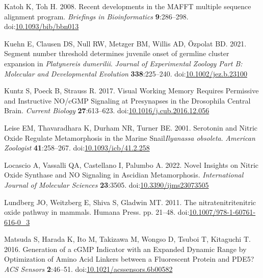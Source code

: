 \documentclass[
  10pt,
  onecolumn]{article}
\newlength{\cslhangindent}
\newlength{\cslentryspacingunit} %
\newenvironment{CSLReferences}[2] %
 {%
  \setlength{\parindent}{0pt}
  \ifodd #1
  \let\oldpar\par
  \def\par{\hangindent=\cslhangindent\oldpar}
  \fi
  \setlength{\parskip}{#2\cslentryspacingunit}
 }%
 {}
\begin{document}
\begin{CSLReferences}{1}{0}
\leavevmode{}%
Katoh K, Toh H. 2008. Recent developments in the MAFFT multiple sequence
alignment program. \emph{Briefings in Bioinformatics}
\textbf{9}:286--298.
doi:\href{https://doi.org/10.1093/bib/bbn013}{10.1093/bib/bbn013}

\leavevmode{}%
Kuehn E, Clausen DS, Null RW, Metzger BM, Willis AD, Özpolat BD. 2021.
Segment number threshold determines juvenile onset of germline cluster
expansion in {\emph{Platynereis dumerilii}}. \emph{Journal of
Experimental Zoology Part B: Molecular and Developmental Evolution}
\textbf{338}:225--240.
doi:\href{https://doi.org/10.1002/jez.b.23100}{10.1002/jez.b.23100}

\leavevmode{}%
Kuntz S, Poeck B, Strauss R. 2017. Visual Working Memory Requires
Permissive and Instructive NO/cGMP Signaling at Presynapses in the
Drosophila Central Brain. \emph{Current Biology} \textbf{27}:613--623.
doi:\href{https://doi.org/10.1016/j.cub.2016.12.056}{10.1016/j.cub.2016.12.056}

\leavevmode{}%
Leise EM, Thavaradhara K, Durham NR, Turner BE. 2001. Serotonin and
Nitric Oxide Regulate Metamorphosis in the Marine Snail{\emph{Ilyanassa
obsoleta}}. \emph{American Zoologist} \textbf{41}:258--267.
doi:\href{https://doi.org/10.1093/icb/41.2.258}{10.1093/icb/41.2.258}

\leavevmode{}%
Locascio A, Vassalli QA, Castellano I, Palumbo A. 2022. Novel Insights
on Nitric Oxide Synthase and NO Signaling in Ascidian Metamorphosis.
\emph{International Journal of Molecular Sciences} \textbf{23}:3505.
doi:\href{https://doi.org/10.3390/ijms23073505}{10.3390/ijms23073505}

\leavevmode{}%
Lundberg JO, Weitzberg E, Shiva S, Gladwin MT. 2011. The
nitrate{\textendash}nitrite{\textendash}nitric oxide pathway in mammals.
Humana Press. pp. 21--48.
doi:\href{https://doi.org/10.1007/978-1-60761-616-0_3}{10.1007/978-1-60761-616-0\_3}

\leavevmode{}%
Matsuda S, Harada K, Ito M, Takizawa M, Wongso D, Tsuboi T, Kitaguchi T.
2016. Generation of a cGMP Indicator with an Expanded Dynamic Range by
Optimization of Amino Acid Linkers between a Fluorescent Protein and
PDE5? \emph{ACS Sensors} \textbf{2}:46--51.
doi:\href{https://doi.org/10.1021/acssensors.6b00582}{10.1021/acssensors.6b00582}


\end{CSLReferences}
\end{document}
